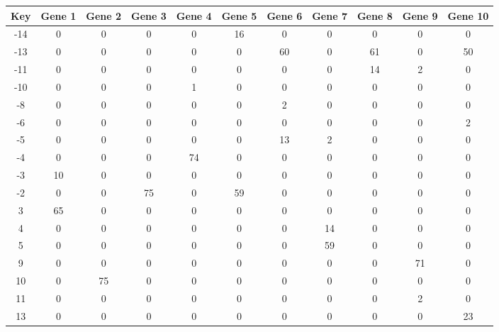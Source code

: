\begin{tabular}{|c|c|c|c|c|c|c|c|c|c|c|}
\hline
Key & Gene 1 & Gene 2 & Gene 3 & Gene 4 & Gene 5 & Gene 6 & Gene 7 & Gene 8 & Gene 9 & Gene 10 \\
\hline
-14 & 0 & 0 & 0 & 0 & 16 & 0 & 0 & 0 & 0 & 0 \\
-13 & 0 & 0 & 0 & 0 & 0 & 60 & 0 & 61 & 0 & 50 \\
-11 & 0 & 0 & 0 & 0 & 0 & 0 & 0 & 14 & 2 & 0 \\
-10 & 0 & 0 & 0 & 1 & 0 & 0 & 0 & 0 & 0 & 0 \\
-8 & 0 & 0 & 0 & 0 & 0 & 2 & 0 & 0 & 0 & 0 \\
-6 & 0 & 0 & 0 & 0 & 0 & 0 & 0 & 0 & 0 & 2 \\
-5 & 0 & 0 & 0 & 0 & 0 & 13 & 2 & 0 & 0 & 0 \\
-4 & 0 & 0 & 0 & 74 & 0 & 0 & 0 & 0 & 0 & 0 \\
-3 & 10 & 0 & 0 & 0 & 0 & 0 & 0 & 0 & 0 & 0 \\
-2 & 0 & 0 & 75 & 0 & 59 & 0 & 0 & 0 & 0 & 0 \\
3 & 65 & 0 & 0 & 0 & 0 & 0 & 0 & 0 & 0 & 0 \\
4 & 0 & 0 & 0 & 0 & 0 & 0 & 14 & 0 & 0 & 0 \\
5 & 0 & 0 & 0 & 0 & 0 & 0 & 59 & 0 & 0 & 0 \\
9 & 0 & 0 & 0 & 0 & 0 & 0 & 0 & 0 & 71 & 0 \\
10 & 0 & 75 & 0 & 0 & 0 & 0 & 0 & 0 & 0 & 0 \\
11 & 0 & 0 & 0 & 0 & 0 & 0 & 0 & 0 & 2 & 0 \\
13 & 0 & 0 & 0 & 0 & 0 & 0 & 0 & 0 & 0 & 23 \\
\hline
\end{tabular}